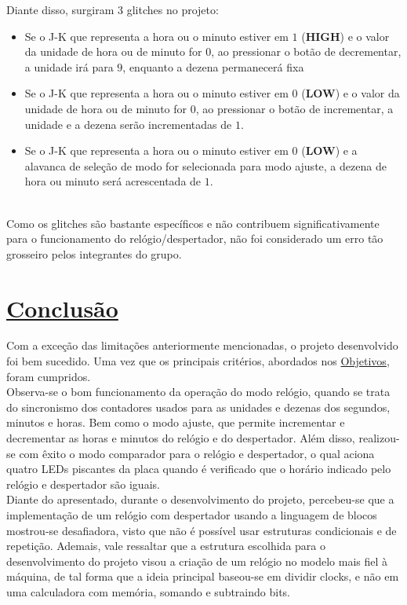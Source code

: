 \documentclass[14pt, oneside]{book}
\newcommand\tab[1][1cm]{\hspace*{#1}}
\theoremstyle{definition}
\begin{document}
            \tab Diante disso, surgiram 3 glitches no projeto:
            \begin{itemize}
                \item Se o J-K que representa a hora ou o minuto estiver em $1$ (\textbf{HIGH}) e o valor da unidade de hora ou de minuto for $0$, ao pressionar o botão de decrementar, a unidade irá para $9$, enquanto a dezena permanecerá fixa
                \item Se o J-K que representa a hora ou o minuto estiver em $0$ (\textbf{LOW}) e o valor da unidade de hora ou de minuto for $0$, ao pressionar o botão de incrementar, a unidade e a dezena serão incrementadas de $1$.
                \item Se o J-K que representa a hora ou o minuto estiver em $0$ (\textbf{LOW}) e a alavanca de seleção de modo for selecionada para modo ajuste, a dezena de hora ou minuto será acrescentada de $1$.
            \end{itemize} \\
            \tab Como os glitches são bastante específicos e não contribuem significativamente para o funcionamento do relógio/despertador, não foi considerado um erro tão grosseiro pelos integrantes do grupo.
            
        \chapter[Conclusão]{\hyperlink{toc}{Conclusão}}
            \tab Com a exceção das limitações anteriormente mencionadas, o projeto desenvolvido foi bem sucedido. Uma vez que os principais critérios, abordados nos \hyperlink{obj}{Objetivos}, foram cumpridos. \\
            \tab Observa-se o bom funcionamento da operação do modo relógio, quando se trata do sincronismo dos contadores usados para as unidades e dezenas dos segundos, minutos e horas. Bem como o modo ajuste, que permite incrementar e decrementar as horas e minutos do relógio e do despertador. Além disso, realizou-se com êxito o modo comparador para o relógio e despertador, o qual aciona quatro LEDs piscantes da placa quando é verificado que o horário indicado pelo relógio e despertador são iguais. \\
            \tab Diante do apresentado, durante o desenvolvimento do projeto, percebeu-se que a implementação de um relógio com despertador usando a linguagem de blocos mostrou-se desafiadora, visto que não é possível usar estruturas condicionais e de repetição. Ademais, vale ressaltar que a estrutura escolhida para o desenvolvimento do projeto visou a criação de um relógio no modelo mais fiel à máquina, de tal forma que a ideia principal baseou-se em dividir clocks, e não em uma calculadora com memória, somando e subtraindo bits.
                    
        
        
\end{document}
